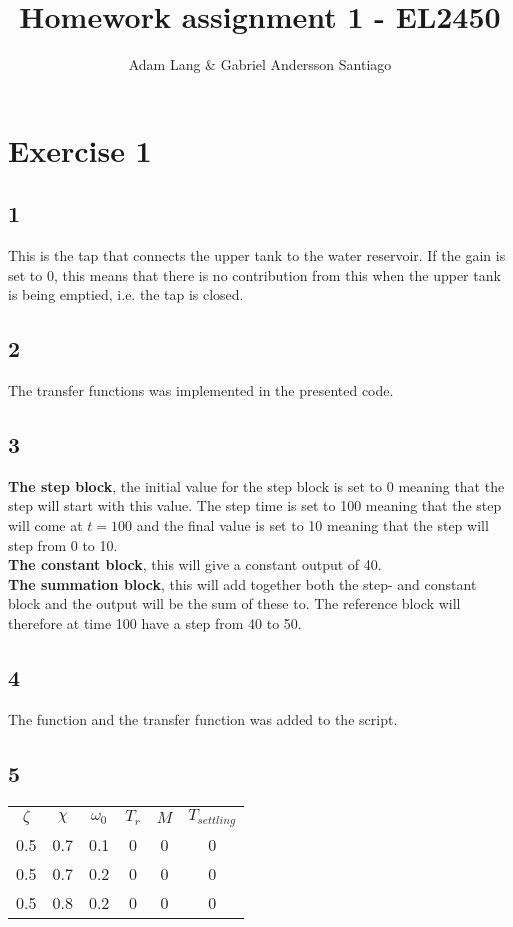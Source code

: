 \documentclass[12pt,a4paper]{article}
\title{Homework assignment 1 - EL2450}
\author{Adam Lang & Gabriel Andersson Santiago}
\begin{document}
\maketitle

\section{Exercise 1}
  
  \subsection{1}
  This is the tap that connects the upper tank to the water reservoir.
  If the gain is set to 0, this means that there is no contribution from
  this when the upper tank is being emptied, i.e. the tap is closed.
  
  \subsection{2}
  The transfer functions was implemented in the presented code.
  
  \subsection{3}
  \textbf{The step block}, the initial value for the step block is set to 
  0 meaning that the step will start with this value. The step time is
  set to 100 meaning that the step will come at $t=100$ and the final
  value is set to 10 meaning that the step will step from 0 to 10.\\
  \textbf{The constant block}, this will give a constant output of 40.\\
  \textbf{The summation block}, this will add together both the step-
  and constant block and the output will be the sum of these to. The
  reference block will therefore at time 100 have a step from 40 to 50.
  
  \subsection{4}
  The function and the transfer function was added to the script.

  \subsection{5}
  \begin{center}
    \begin{tabular}{c | c | c | c | c | c}
      \hline
      $\zeta$ & $\chi$ & $\omega_0$ & $T_r$ & $M$ & $T_{settling}$ \\
      0.5 & 0.7 & 0.1 & 0 & 0 & 0 \\ \hline
      0.5 & 0.7 & 0.2 & 0 & 0 & 0 \\ \hline
      0.5 & 0.8 & 0.2 & 0 & 0 & 0 \\
    \end{tabular}
  \end{center}
\end{document}
